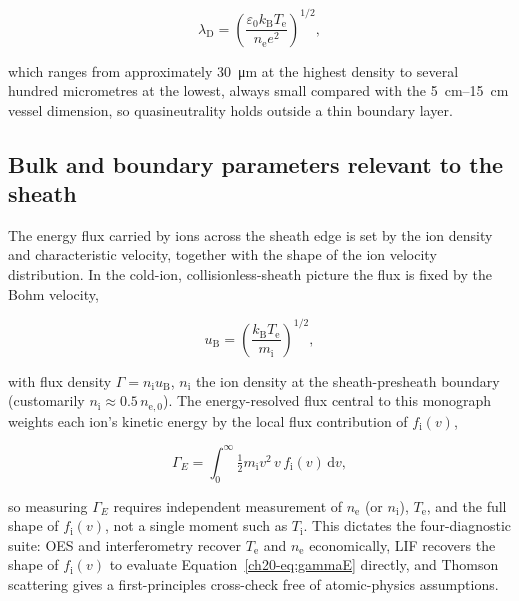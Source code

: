 \begin{equation}
\lambda_{\mathrm{D}} = \left( \frac{\varepsilon_{0} k_{\mathrm{B}} T_{\mathrm{e}}}{n_{\mathrm{e}} e^{2}} \right)^{1/2},
\label{ch20-eq:debye}
\end{equation}

which ranges from approximately \SI{30}{\micro\meter} at the highest density to several hundred micrometres at the lowest, always small compared with the \SIrange{5}{15}{\centi\meter} vessel dimension, so quasineutrality holds outside a thin boundary layer.

\subsection{Bulk and boundary parameters relevant to the sheath}

The energy flux carried by ions across the sheath edge is set by the ion density and characteristic velocity, together with the shape of the ion velocity distribution. In the cold-ion, collisionless-sheath picture the flux is fixed by the Bohm velocity,

\begin{equation}
u_{\mathrm{B}} = \left( \frac{k_{\mathrm{B}} T_{\mathrm{e}}}{m_{\mathrm{i}}} \right)^{1/2},
\label{ch20-eq:bohm}
\end{equation}

with flux density $\Gamma = n_{\mathrm{i}} u_{\mathrm{B}}$, $n_{\mathrm{i}}$ the ion density at the sheath-presheath boundary (customarily $n_{\mathrm{i}} \approx 0.5\,n_{\mathrm{e},0}$). The energy-resolved flux central to this monograph weights each ion's kinetic energy by the local flux contribution of $f_{\mathrm{i}}(v)$,

\begin{equation}
\Gamma_{E} = \int_{0}^{\infty} \tfrac{1}{2} m_{\mathrm{i}} v^{2}\, v\, f_{\mathrm{i}}(v)\, \mathrm{d}v ,
\label{ch20-eq:gammaE}
\end{equation}

so measuring $\Gamma_{E}$ requires independent measurement of $n_{\mathrm{e}}$ (or $n_{\mathrm{i}}$), $T_{\mathrm{e}}$, and the full shape of $f_{\mathrm{i}}(v)$, not a single moment such as $T_{\mathrm{i}}$. This dictates the four-diagnostic suite: OES and interferometry recover $T_{\mathrm{e}}$ and $n_{\mathrm{e}}$ economically, LIF recovers the shape of $f_{\mathrm{i}}(v)$ to evaluate Equation~\eqref{ch20-eq:gammaE} directly, and Thomson scattering gives a first-principles cross-check free of atomic-physics assumptions.

